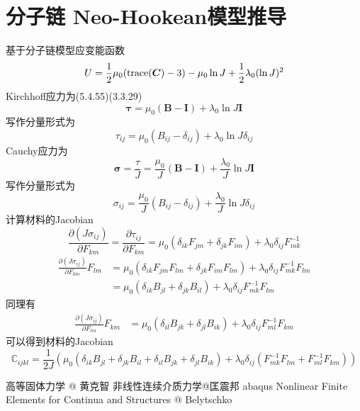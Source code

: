 \documentclass{article}
\begin{document}
\section{分子链 Neo-Hookean模型推导}
基于分子链模型应变能函数
$$U=\frac{1}{2}\mu_0({\rm trace}(\bm{C})-3)-\mu_0 \ln J+\frac{1}{2}\lambda_0(\ln J)^2$$
Kirchhoff应力为\cite{bely}(5.4.55)\cite{huang}(3.3.29)
$$\bm{\tau}=\mu_0(\bm{B}-\bm{I}) + \lambda_0 \ln J \bm{I}$$
写作分量形式为
$$\tau_{ij}=\mu_0(B_{ij}-\delta_{ij}) + \lambda_0 \ln J \delta_{ij}$$
Cauchy应力为
$$\bm{\sigma}=\frac{\tau}{J}=\frac{\mu_0}{J}(\bm{B}-\bm{I}) + \frac{\lambda_0}{J} \ln J \bm{I}$$
写作分量形式为
$$\sigma_{ij}=\frac{\mu_0}{J}(B_{ij}-\delta_{ij}) + \frac{\lambda_0}{J} \ln J \delta_{ij}$$
计算材料的Jacobian
$$\frac{\partial (J\sigma_{ij})}{\partial F_{km}}=\frac{\partial \tau_{ij}}{\partial F_{km}}=\mu_0(\delta_{ik}F_{jm}+\delta_{jk}F_{im}) + \lambda_0\delta_{ij}F_{mk}^{-1}$$
\begin{equation*}
    \begin{aligned}
        \frac{\partial (J\sigma_{ij})}{\partial F_{km}}F_{lm} & =\mu_0(\delta_{ik}F_{jm}F_{lm}+\delta_{jk}F_{im}F_{lm}) + \lambda_0\delta_{ij}F_{mk}^{-1}F_{lm} \\
                                                              & =\mu_0(\delta_{ik}B_{jl}+\delta_{jk}B_{il}) + \lambda_0\delta_{ij}F_{mk}^{-1}F_{lm}
    \end{aligned}
\end{equation*}
同理有
\begin{equation*}
    \begin{aligned}
        \frac{\partial (J\sigma_{ij})}{\partial F_{lm}}F_{km} & =\mu_0(\delta_{il}B_{jk}+\delta_{jl}B_{ik}) + \lambda_0\delta_{ij}F_{ml}^{-1}F_{km}
    \end{aligned}
\end{equation*}
可以得到材料的Jacobian
$$\mathbb{C}_{ijkl}=\frac{1}{2J}\left(\mu_0(\delta_{ik}B_{jl}+\delta_{jk}B_{il}+\delta_{il}B_{jk}+\delta_{jl}B_{ik}) +\lambda_0\delta_{ij}(F_{mk}^{-1}F_{lm}+F_{ml}^{-1}F_{km}) \right)$$



\begin{thebibliography}{1}
     高等固体力学 @ 黄克智
     非线性连续介质力学@匡震邦
     abaqus
      Nonlinear Finite Elements for Continua and Structures @ Belytschko
\end{thebibliography}
\end{document}

